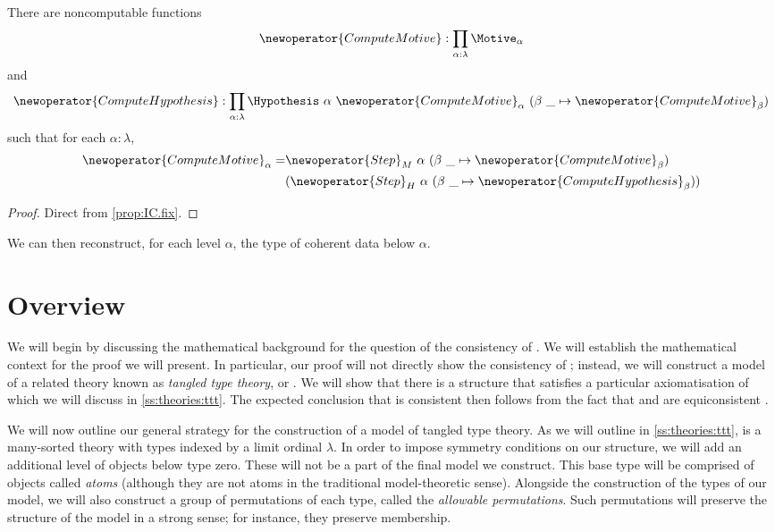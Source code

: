 \begin{theorem}
  \label{thm:model_construction}
  There are noncomputable functions
  \[ \newoperator{ComputeMotive} : \prod_{\alpha : \lambda} \Motive_\alpha \]
  and
  \[ \newoperator{ComputeHypothesis} : \prod_{\alpha : \lambda} \Hypothesis\ \alpha\ \newoperator{ComputeMotive}_\alpha\ (\beta\ \_ \mapsto \newoperator{ComputeMotive}_\beta) \]
  such that for each \( \alpha : \lambda \),
  \begin{align*}
    \newoperator{ComputeMotive}_\alpha = &\newoperator{Step}_M\ \alpha\ (\beta\ \_ \mapsto \newoperator{ComputeMotive}_\beta)\\
    &(\newoperator{Step}_H\ \alpha\ (\beta\ \_ \mapsto \newoperator{ComputeHypothesis}_\beta))
  \end{align*}
\end{theorem}
\begin{proof}
  Direct from \cref{prop:IC.fix}.
\end{proof}
We can then reconstruct, for each level \( \alpha \), the type of coherent data below \( \alpha \).


\section{Overview}
\label{s:overview}

We will begin by discussing the mathematical background for the question of the consistency of \NF.
We will establish the mathematical context for the proof we will present.
In particular, our proof will not directly show the consistency of \NF; instead, we will construct a model of a related theory known as \emph{tangled type theory}, or \TTT.
We will show that there is a structure that satisfies a particular axiomatisation of {\TTT} which we will discuss in \cref{ss:theories:ttt}.
The expected conclusion that {\NF} is consistent then follows from the fact that {\NF} and {\TTT} are equiconsistent \cite{holmes-ttt}.

We will now outline our general strategy for the construction of a model of tangled type theory.
As we will outline in \cref{ss:theories:ttt}, {\TTT} is a many-sorted theory with types indexed by a limit ordinal \( \lambda \).
In order to impose symmetry conditions on our structure, we will add an additional level of objects below type zero.
These will not be a part of the final model we construct.
This base type will be comprised of objects called \emph{atoms} (although they are not atoms in the traditional model-theoretic sense).
Alongside the construction of the types of our model, we will also construct a group of permutations of each type, called the \emph{allowable permutations}.
Such permutations will preserve the structure of the model in a strong sense; for instance, they preserve membership.

